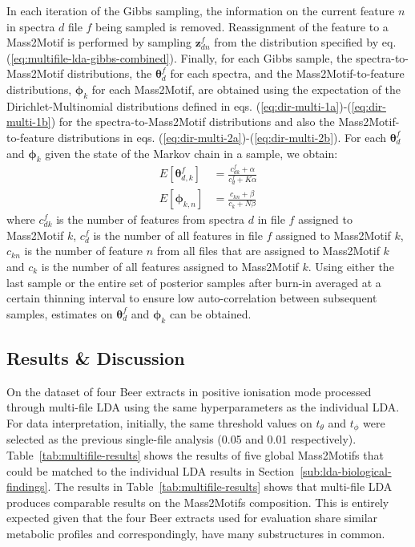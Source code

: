 In each iteration of the Gibbs sampling, the information on the current feature $n$ in spectra $d$ file $f$ being sampled is removed. Reassignment of the feature to a Mass2Motif is performed by sampling $\boldsymbol{z}_{dn}^f$ from the distribution specified by eq. (\ref{eq:multifile-lda-gibbs-combined}). Finally, for each Gibbs sample, the spectra-to-Mass2Motif distributions, the $\boldsymbol{\theta}_{d}^f$ for each spectra, and the Mass2Motif-to-feature distributions, $\boldsymbol{\phi}_k$ for each Mass2Motif, are obtained using the expectation of the Dirichlet-Multinomial distributions defined in eqs. (\ref{eq:dir-multi-1a})-(\ref{eq:dir-multi-1b}) for the spectra-to-Mass2Motif distributions and also the Mass2Motif-to-feature distributions in eqs. (\ref{eq:dir-multi-2a})-(\ref{eq:dir-multi-2b}). For each $\boldsymbol{\theta}_{d}^f$ and $\boldsymbol{\phi}_k$ given the state of the Markov chain in a sample, we obtain:
\begin{align}
E[\boldsymbol{\theta}_{d,k}^f] &= \frac{c_{dk}^f+\alpha}{c_{d}^f+K\alpha} \\
E[\boldsymbol{\phi}_{k,n}] &= \frac{c_{kn}+\beta}{c_{k}+N\beta}
\end{align}
where $c_{dk}^f$ is the number of features from spectra $d$ in file $f$ assigned to Mass2Motif $k$, $c_{d}^f$ is the number of all features in file $f$ assigned to Mass2Motif $k$, $c_{kn}$ is the number of feature $n$ from all files that are assigned to Mass2Motif $k$ and $c_k$ is the number of all features assigned to Mass2Motif $k$. Using either the last sample or the entire set of posterior samples after burn-in averaged at a certain thinning interval to ensure low auto-correlation between subsequent samples, estimates on $\boldsymbol{\theta}_{d}^f$ and $\boldsymbol{\phi}_k$ can be obtained.

\subsection{Results \& Discussion}

On the dataset of four Beer extracts in positive ionisation mode processed through multi-file LDA using the same hyperparameters as the individual LDA. For data interpretation, initially, the same threshold values on $t_{\theta}$ and $t_{\phi}$ were selected as the previous single-file analysis (0.05 and 0.01 respectively). Table~\ref{tab:multifile-results} shows the results of five global Mass2Motifs that could be matched to the individual LDA results in Section~\ref{sub:lda-biological-findings}. The results in Table~\ref{tab:multifile-results} shows that multi-file LDA produces comparable results on the Mass2Motifs composition. This is entirely expected given that the four Beer extracts used for evaluation share similar metabolic profiles and correspondingly, have many substructures in common. 

